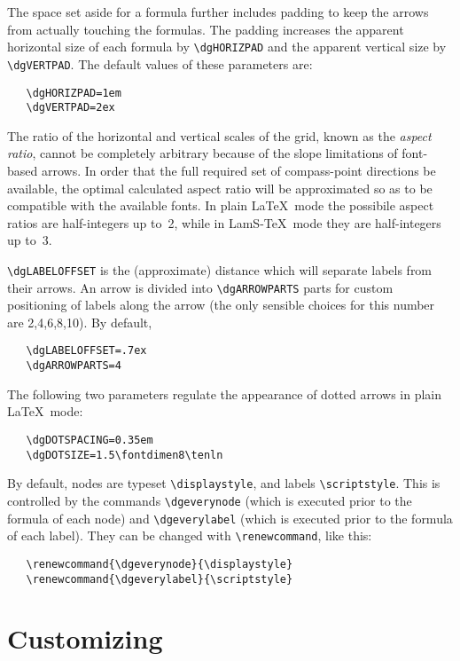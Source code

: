 The space set aside for a formula
further includes padding to keep the arrows from actually touching the
formulas.  The padding increases the apparent horizontal size of
each formula by \verb"\dgHORIZPAD" and the apparent vertical size
by \verb"\dgVERTPAD". The default values of these parameters are:
\begin{verbatim}
   \dgHORIZPAD=1em
   \dgVERTPAD=2ex
\end{verbatim}

The ratio of the horizontal and vertical scales of the grid,
known as the {\em aspect ratio\/}, cannot be completely
arbitrary because of the slope limitations of font-based arrows.
In order that the full required set of compass-point directions be
available, the optimal calculated aspect ratio will be approximated
so as to be compatible with the available fonts.  In plain
\LaTeX\ mode the possibile aspect ratios are half-integers up to~2,
while in LamS-\TeX\ mode they are half-integers up to~3.

\verb"\dgLABELOFFSET" is the (approximate) distance which will 
separate labels from their arrows.  An arrow is divided into 
\verb"\dgARROWPARTS" parts for custom positioning of labels along the 
arrow (the only sensible choices for this number are 2,4,6,8,10).  By 
default,
\begin{verbatim}
   \dgLABELOFFSET=.7ex
   \dgARROWPARTS=4
\end{verbatim}

The following two parameters regulate the appearance of dotted arrows 
in plain \LaTeX\ mode:
\begin{verbatim}
   \dgDOTSPACING=0.35em
   \dgDOTSIZE=1.5\fontdimen8\tenln
\end{verbatim}

By default, nodes are typeset \verb"\displaystyle", and labels
\verb"\scriptstyle".  This is controlled by the commands 
\verb"\dgeverynode" (which is executed prior to the formula of each 
node) and \verb"\dgeverylabel" (which is executed prior to the 
formula of each label).  They can be changed with 
\verb"\renewcommand", like this:
\begin{verbatim}
   \renewcommand{\dgeverynode}{\displaystyle}
   \renewcommand{\dgeverylabel}{\scriptstyle}
\end{verbatim}


\section{Customizing}

